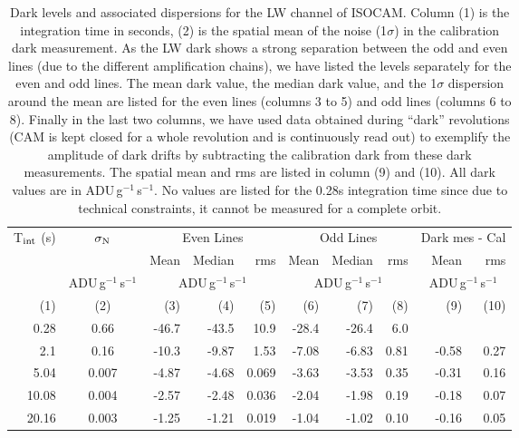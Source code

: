 
\setlength{\tabcolsep}{1mm}
\begin{table}
{\small
\begin{tabular}{r|c|rrr|rrr||rr}
\hline
T$_{\rm int}$ (s) & $\sigma_{\rm N}$ & \multicolumn{3}{|c|}{Even Lines} &
\multicolumn{3}{|c||}{Odd Lines} & \multicolumn{2}{|c}{Dark mes - Cal} \\
              &                  & Mean & Median & rms & Mean & Median & rms &
Mean & rms \\
              & ADU\,g$^{-1}$\,s$^{-1}$ & 
\multicolumn{3}{|c|}{ADU\,g$^{-1}$\,s$^{-1}$} &
\multicolumn{3}{|c||}{ADU\,g$^{-1}$\,s$^{-1}$} &
\multicolumn{2}{|c}{ADU\,g$^{-1}$\,s$^{-1}$} \\
(1) & (2) & (3) & (4) & (5) & (6) & (7) & (8) & (9) & (10) \\
\hline
0.28  & 0.66 & -46.7 & -43.5 & 10.9 & -28.4 & -26.4 & 6.0 & & \\
2.1   & 0.16 & -10.3 & -9.87 & 1.53 & -7.08 & -6.83 & 0.81  & -0.58 & 0.27 \\
5.04  & 0.007 & -4.87 & -4.68 & 0.069  & -3.63 & -3.53 & 0.35  & -0.31 & 0.16 \\
10.08 & 0.004 & -2.57 & -2.48 & 0.036  & -2.04 & -1.98 & 0.19  & -0.18 & 0.07 \\
20.16 & 0.003 & -1.25 & -1.21 & 0.019  & -1.04 & -1.02 & 0.10  & -0.16 & 0.05 \\
\end{tabular}

\caption{Dark levels and associated dispersions for the LW channel of
ISOCAM. Column (1) is the integration time in seconds, (2) is the
spatial mean of the noise (1$\sigma$) in the calibration dark
measurement. As the LW dark shows a strong separation between the odd
and even lines (due to the different amplification chains), we have
listed the levels separately for the even and odd lines. 
The mean dark value, the median dark value, and the
1$\sigma$ dispersion around the mean are listed for the even lines
(columns 3 to 5) and odd lines (columns 6 to 8). 
Finally in the last two columns,
we have used data obtained during ``dark'' revolutions (CAM is kept
closed for a whole revolution and is continuously read out) to
exemplify the amplitude of dark drifts by subtracting the calibration
dark from these dark measurements. The spatial mean and rms are listed
in column (9) and (10). All dark values are in
ADU\,g$^{-1}$\,s$^{-1}$. No values are listed for the 0.28s
integration time since due to technical constraints, it cannot be measured
for a complete orbit.}
}
\label{tab:dk}
\end{table}

